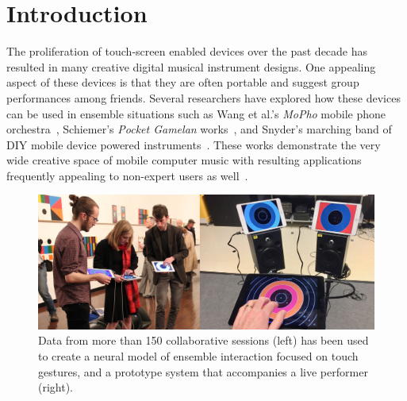 \documentclass[sigchi, authorversion=true]{acmart}
\begin{document}


\maketitle

\section{Introduction}

The proliferation of touch-screen enabled devices over the past decade
has resulted in many creative digital musical instrument designs. One
appealing aspect of these devices is that they are often portable and
suggest group performances among friends. Several researchers have
explored how these devices can be used in ensemble situations such as
Wang et al.'s \emph{MoPho} mobile phone orchestra~\cite{Wang:2014cs},
Schiemer's \emph{Pocket Gamelan} works~\cite{Greg-Schiemer:2007mz},
and Snyder's marching band of DIY mobile device powered
instruments~\cite{Snyder:2014dp}. These works demonstrate the very
wide creative space of mobile computer music with resulting
applications frequently appealing to non-expert users as
well~\cite{Wang:2014ul, Hamilton:2011aa}.

\begin{figure}
  \includegraphics[width=\columnwidth]{neural-mode-ensemble}
  \caption{Data from more than 150 collaborative sessions (left) has
    been used to create a neural model of ensemble interaction
    focused on touch gestures, and a prototype system that
    accompanies a live performer
    (right).}\label{fig:performance-and-system}
\end{figure}
\end{document}
